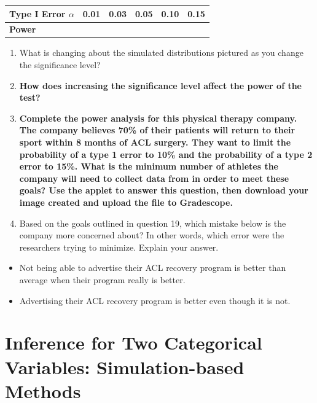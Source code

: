 \documentclass[
]{report}
\begin{document}
\setlength\tabcolsep{0.5cm}
\begin{longtable}{|l|c|c|c|c|c|}
\hline
\textbf{Type I Error $\alpha$}& 0.01 & 0.03 & 0.05 & 0.10 & 0.15 \\ \hline
\textbf{Power} & & & & &  \\ \hline
\end{longtable}

\begin{enumerate}
\def\labelenumi{\arabic{enumi}.}
\setcounter{enumi}{16}
\item
  What is changing about the simulated distributions pictured as you change the significance level?
  \vspace{0.5in}
\item
  \textbf{How does increasing the significance level affect the power of the test?}
  \vspace{0.5in}
\item
  \textbf{Complete the power analysis for this physical therapy company. The company believes 70\% of their patients will return to their sport within 8 months of ACL surgery. They want to limit the probability of a type 1 error to 10\% and the probability of a type 2 error to 15\%. What is the minimum number of athletes the company will need to collect data from in order to meet these goals? Use the applet to answer this question, then download your image created and upload the file to Gradescope.}
  \vspace{0.4in}
\item
  Based on the goals outlined in question 19, which mistake below is the company more concerned about? In other words, which error were the researchers trying to minimize. Explain your answer.
\end{enumerate}

\begin{itemize}
\item
  Not being able to advertise their ACL recovery program is better than average when their program really is better.
\item
  Advertising their ACL recovery program is better even though it is not.
\end{itemize}

\vspace{0.8in}

\newpage

\hypertarget{inference-for-two-categorical-variables-simulation-based-methods}{%
\chapter{Inference for Two Categorical Variables: Simulation-based Methods}\label{inference-for-two-categorical-variables-simulation-based-methods}}
\end{document}
